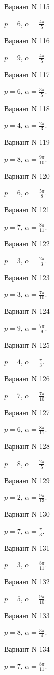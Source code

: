 \documentclass[11pt]{report}
\begin{document}
Вариант N 115

$p = 6$, $\alpha = \frac{4 \pi}{5}$.

Вариант N 116

$p = 9$, $\alpha = \frac{4 \pi}{5}$.

Вариант N 117

$p = 6$, $\alpha = \frac{3 \pi}{5}$.

Вариант N 118

$p = 4$, $\alpha = \frac{2 \pi}{3}$.

Вариант N 119

$p = 8$, $\alpha = \frac{9 \pi}{10}$.

Вариант N 120

$p = 6$, $\alpha = \frac{5 \pi}{8}$.

Вариант N 121

$p = 7$, $\alpha = \frac{8 \pi}{11}$.

Вариант N 122

$p = 3$, $\alpha = \frac{2 \pi}{3}$.

Вариант N 123

$p = 3$, $\alpha = \frac{7 \pi}{10}$.

Вариант N 124

$p = 9$, $\alpha = \frac{7 \pi}{9}$.

Вариант N 125

$p = 4$, $\alpha = \frac{\pi}{3}$.

Вариант N 126

$p = 7$, $\alpha = \frac{7 \pi}{10}$.

Вариант N 127

$p = 6$, $\alpha = \frac{8 \pi}{11}$.

Вариант N 128

$p = 8$, $\alpha = \frac{2 \pi}{5}$.

Вариант N 129

$p = 2$, $\alpha = \frac{9 \pi}{13}$.

Вариант N 130

$p = 7$, $\alpha = \frac{\pi}{3}$.

Вариант N 131

$p = 3$, $\alpha = \frac{8 \pi}{11}$.

Вариант N 132

$p = 5$, $\alpha = \frac{9 \pi}{10}$.

Вариант N 133

$p = 8$, $\alpha = \frac{3 \pi}{4}$.

Вариант N 134

$p = 7$, $\alpha = \frac{8 \pi}{11}$.
\end{document}
